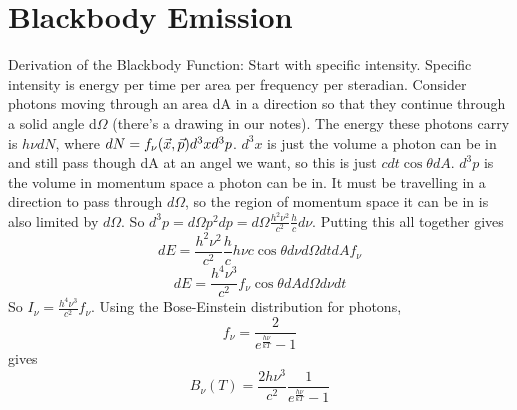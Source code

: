 \section{Blackbody Emission}
Derivation of the Blackbody Function:
Start with specific intensity.  Specific intensity is energy per time per area per frequency per 
steradian.  Consider photons moving through an area dA in a direction so that they continue 
through a solid angle d$\Omega$ (there's a drawing in our notes).  The energy these photons carry 
is $h\nu dN$, where $dN=f_{\nu}(\vec{x},\vec{p})d^3xd^3p$.  $d^3x$ is just the volume a photon can be in 
and still pass though dA at an angel we want, so this is just $cdt\cos{\theta}dA$.  $d^3p$ is the 
volume in momentum space a photon can be in.  It must be travelling in a direction to pass through 
$d\Omega$, so the region of momentum space it can be in is also limited by $d\Omega$.  So 
$d^3p=d\Omega p^2dp=d\Omega \frac{h^2\nu^2}{c^2}\frac{h}{c}d\nu$.  Putting this all together gives 
\begin{displaymath}dE=\frac{h^2\nu^2}{c^2}\frac{h}{c}h\nu c\cos{\theta}d\nu d\Omega dtdAf_{\nu}\end{displaymath}
\begin{displaymath}dE=\frac{h^4\nu^3}{c^2}f_{\nu}\cos{\theta}dAd\Omega d\nu dt\end{displaymath}
So $I_{\nu}=\frac{h^4\nu^3}{c^2}f_{\nu}$.
Using the Bose-Einstein distribution for photons, 
\begin{displaymath}f_{\nu}=\frac{2}{e^{\frac{h\nu}{kT}}-1}\end{displaymath}
gives
\begin{displaymath}\boxed{B_{\nu}(T)=\frac{2h\nu^3}{c^2}\frac{1}{e^{\frac{h\nu}{kT}}-1}}\end{displaymath}

